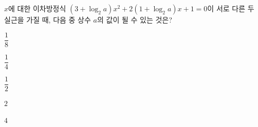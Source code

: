 $x$에 대한 이차방정식 $(3+\log_2 a)x^2+2(1+\log_2 a)x+1=0$이 서로 다른 두 실근을 가질 때, 다음 중 상수 $a$의 값이 될 수 있는 것은?
\begin{choices32}{\rule[-3ex]{0pt}{8ex}$\dfrac{1}{8}$}{\rule[-3ex]{0pt}{8ex}$\dfrac{1}{4}$}{\rule[-3ex]{0pt}{8ex}$\dfrac{1}{2}$}{\rule[-3ex]{0pt}{8ex}$2$}{\rule[-3ex]{0pt}{8ex}$4$}\end{choices32}
